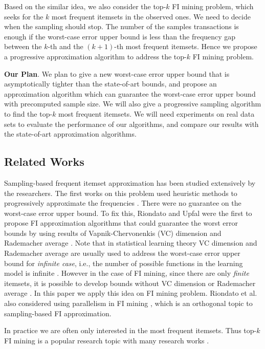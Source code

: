 \documentclass{article}
\begin{document}
Based on the similar idea, we also consider the top-$k$ FI mining problem, which seeks for the $k$ most frequent itemsets in the observed ones. We need to decide when the sampling should stop. The number of the samples transactions is enough if the worst-case error upper bound is less than the frequency gap between the $k$-th and the $(k+1)$-th most frequent itemsets. Hence we propose a progressive approximation algorithm to address the top-$k$ FI mining problem.

{\bf Our Plan}. We plan to give a new worst-case error upper bound that is asymptotically tighter than the state-of-art bounds, and propose an approximation algorithm which can guarantee the worst-case error upper bound with precomputed sample size. We will also give a progressive sampling algorithm to find the top-$k$ most frequent itemsets. We will need experiments on real data sets to evaluate the performance of our algorithms, and compare our results with the state-of-art approximation algorithms.

\subsection{Related Works}
\label{sec:rw}
Sampling-based frequent itemset approximation has been studied extensively by the researchers. The first works on this problem used heuristic methods to progressively approximate the frequencies \cite{CHS02,CCY05,Parth02}. There were no guarantee on the worst-case error upper bound. To fix this, Riondato and Upfal were the first to propose FI approximation algorithms that could guarantee the worst error bounds by using results of Vapnik-Chervonenkis (VC) dimension \cite{RU12,RU14} and Rademacher average \cite{RU15}. Note that in statistical learning theory VC dimension and Rademacher average are usually used to address the worst-case error upper bound for \emph{infinite case}, i.e., the number of possible functions in the learning model is infinite \cite{BBL04}. However in the case of FI mining, since there are only \emph{finite} itemsets, it is possible to develop bounds without VC dimension or Rademacher average \cite{BBL04}. In this paper we apply this idea on FI mining problem. Riondato et al. also considered using parallelism in FI mining \cite{RDF12}, which is an orthogonal topic to sampling-based FI approximation.

In practice we are often only interested in the most frequent itemsets. Thus top-$k$ FI mining is a popular research topic with many research works \cite{PRU10,SW02,RU15,RV14}. 
\end{document}
